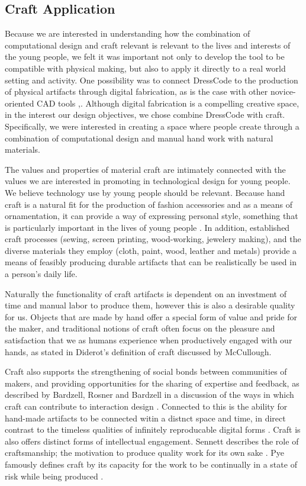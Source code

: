 \documentclass{sigchi}
\begin{document}
\subsection{Craft Application}
Because we are interested in understanding how the combination of computational design and craft relevant is relevant to the lives and interests of the young people, we felt it was important not only to develop the tool to be compatible with physical making, but also to apply it directly to a real world setting and activity. One possibility was to connect DressCode to the production of physical artifacts through digital fabrication, as is the case with other novice-oriented CAD tools \cite{tinkercad},\cite{123D}. Although digital fabrication is a compelling creative space, in the interest our design objectives, we chose combine DressCode with craft. Specifically, we were interested in creating a space where people create through a combination of computational design and manual hand work with natural materials. 

The values and properties of material craft are intimately connected with the values we are interested in promoting in technological design for young people. We believe technology use by young people should be relevant. Because hand craft is a natural fit for the production of fashion accessories and as a means of ornamentation, it can provide a way of expressing personal style, something that is particularly important in the lives of young people \cite{lilypad}. In addition, established craft processes (sewing, screen printing, wood-working, jewelery making), and the diverse materials they employ (cloth, paint, wood, leather and metals) provide a means of feasibly producing durable artifacts that can be realistically be used in a person's daily life. 

Naturally the functionality of craft artifacts is dependent on an investment of time and manual labor to produce them, however this is also a desirable quality for us. Objects that are made by hand offer a special form of value and pride for the maker, and traditional notions of craft often focus on the pleasure and satisfaction that we as humans experience when productively engaged with our hands, as stated in Diderot's definition of craft discussed by McCullough\cite{abstracting_craft}. 

Craft also supports the strengthening of social bonds between communities of makers, and providing opportunities for the sharing of expertise and feedback, as described by Bardzell, Rosner and Bardzell in a discussion of the ways in which craft can contribute to interaction design \cite{bardzell}. Connected to this is the ability for hand-made artifacts to be connected witin a distnct space and time, in direct contrast to the timeless qualities of infinitely reproducable digital forms \cite{zoran}. Craft is also offers distinct forms of intellectual engagement. Sennett describes the role of craftsmanship; the motivation to produce quality work for its own sake \cite{the_craftsman}. Pye famously defines craft by its capacity for the work to be continually in a state of risk while being produced 
\cite{pye}. 
\end{document}
